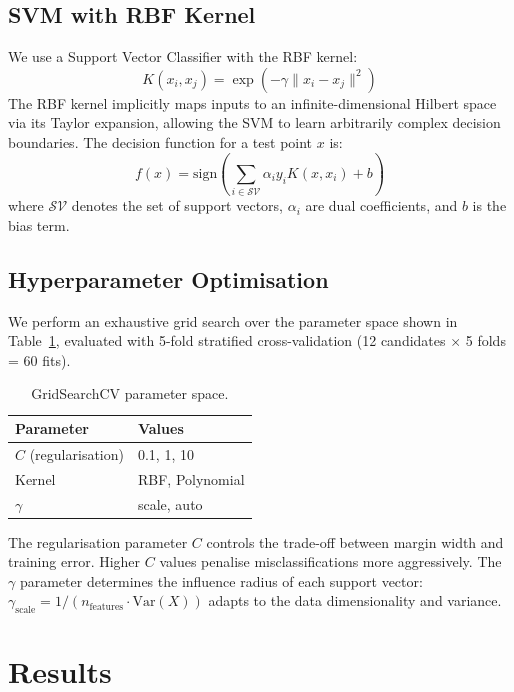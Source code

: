 \documentclass[10pt,twocolumn,letterpaper]{article}
\begin{document}
\subsection{SVM with RBF Kernel}
We use a Support Vector Classifier with the RBF kernel:
\begin{equation}
K(x_i, x_j) = \exp\left(-\gamma \|x_i - x_j\|^2\right)
\end{equation}
The RBF kernel implicitly maps inputs to an infinite-dimensional Hilbert space via its Taylor expansion, allowing the SVM to learn arbitrarily complex decision boundaries. The decision function for a test point $x$ is:
\begin{equation}
f(x) = \text{sign}\left(\sum_{i \in \mathcal{SV}} \alpha_i y_i K(x, x_i) + b\right)
\end{equation}
where $\mathcal{SV}$ denotes the set of support vectors, $\alpha_i$ are dual coefficients, and $b$ is the bias term.

\subsection{Hyperparameter Optimisation}
We perform an exhaustive grid search over the parameter space shown in Table~\ref{tab:grid}, evaluated with 5-fold stratified cross-validation (12 candidates $\times$ 5 folds = 60 fits).

\begin{table}[H]
\centering
\caption{GridSearchCV parameter space.}
\label{tab:grid}
\small
\begin{tabular}{ll}
\toprule
\textbf{Parameter} & \textbf{Values} \\
\midrule
$C$ (regularisation) & 0.1, 1, 10 \\
Kernel & RBF, Polynomial \\
$\gamma$ & scale, auto \\
\bottomrule
\end{tabular}
\end{table}

The regularisation parameter $C$ controls the trade-off between margin width and training error. Higher $C$ values penalise misclassifications more aggressively. The $\gamma$ parameter determines the influence radius of each support vector: $\gamma_{\text{scale}} = 1 / (n_{\text{features}} \cdot \text{Var}(X))$ adapts to the data dimensionality and variance.

\section{Results}
\end{document}
